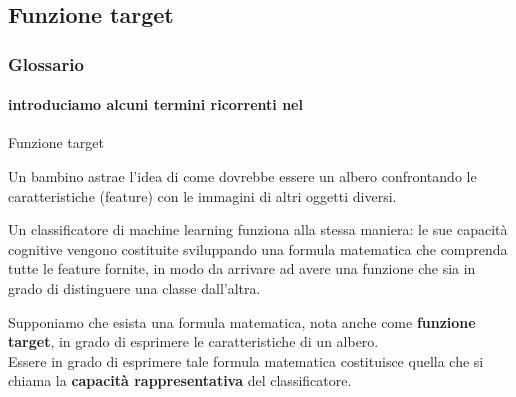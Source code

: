 \subsection[Funzione target]{Funzione target}
\begin{frame}

	\frametitle{Glossario}
	\framesubtitle{introduciamo alcuni termini ricorrenti nel \ml}

	\begin{block}{Funzione target}

		Un bambino  astrae l’idea di come dovrebbe essere un albero confrontando le caratteristiche (feature) con le immagini di altri oggetti diversi.\\
		\vspace{2mm}

		Un classificatore di machine learning funziona alla stessa maniera: le sue capacità cognitive vengono costituite sviluppando una formula matematica che comprenda tutte le feature fornite, in modo da arrivare ad avere una funzione che sia in grado di distinguere una classe dall’altra.\\
		\vspace{3mm}

		Supponiamo che esista una formula matematica, nota anche come \textbf{funzione target}, in grado di esprimere le caratteristiche di un albero.\\
		\vspace{2mm}
		Essere in grado di esprimere tale formula matematica costituisce quella che si chiama la \textbf{capacità rappresentativa} del classificatore.
	\end{block}

\end{frame}


